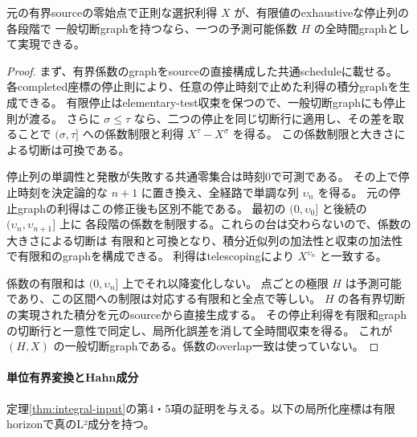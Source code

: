 \begin{proposition}[停止区間の貼り合わせによる全時間の実現]
元の有界sourceの零始点で正則な選択利得 $X$ が、有限値のexhaustiveな停止列の各段階で
一般切断graphを持つなら、一つの予測可能係数 $H$ の全時間graphとして実現できる。
\end{proposition}
\begin{proof}
まず、有界係数のgraphをsourceの直接構成した共通scheduleに載せる。
各completed座標の停止則により、任意の停止時刻で止めた利得の積分graphを生成できる。
有限停止はelementary-test収束を保つので、一般切断graphにも停止則が渡る。
さらに $\sigma\le\tau$ なら、二つの停止を同じ切断行に適用し、その差を取ることで
$(\sigma,\tau]$ への係数制限と利得 $X^\tau-X^\sigma$ を得る。
この係数制限と大きさによる切断は可換である。

停止列の単調性と発散が失敗する共通零集合は時刻0で可測である。
その上で停止時刻を決定論的な $n+1$ に置き換え、全経路で単調な列 $\upsilon_n$ を得る。
元の停止graphの利得はこの修正後も区別不能である。
最初の $(0,\upsilon_0]$ と後続の $(\upsilon_n,\upsilon_{n+1}]$ 上に
各段階の係数を制限する。これらの台は交わらないので、係数の大きさによる切断は
有限和と可換となり、積分近似列の加法性と収束の加法性で有限和のgraphを構成できる。
利得はtelescopingにより $X^{\upsilon_n}$ と一致する。

係数の有限和は $(0,\upsilon_n]$ 上でそれ以降変化しない。
点ごとの極限 $H$ は予測可能であり、この区間への制限は対応する有限和と全点で等しい。
$H$ の各有界切断の実現された積分を元のsourceから直接生成する。
その停止利得を有限和graphの切断行と一意性で同定し、局所化誤差を消して全時間収束を得る。
これが $(H,X)$ の一般切断graphである。係数のoverlap一致は使っていない。

\end{proof}




\paragraph{単位有界変換とHahn成分}
定理\ref{thm:integral-input}の第4・5項の証明を与える。以下の局所化座標は有限horizonで真のL²成分を持つ。

